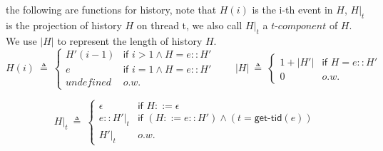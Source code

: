 \documentclass[UTF8, 8pt, a4paper ]{ctexart}
\begin{document}
\begin{small}
\begin{center}
	\vspace{0.3cm}
	
	the following are functions for history, note that $ H(i) $ is the i-th event in $ H $, $ H|_t $ is the projection of history $ H $ on thread t, we also call $ H|_t $ a $ \textit{t-component} $ of $ H $. We use $ |H| $ to represent the length of history $ H $.
	$$ H(i)\ \triangleq\ \left\{
	\begin{array}{ll}
	H'(i-1) & \textsf{if } i > 1 \land H = e::H'\\
	e & \textsf{if } i = 1 \land H = e::H'\\
	\textit{undefined} & \textit{o.w.}
	\end{array}
	\right.
	\qquad
	|H| \ \triangleq\ \left\{
	\begin{array}{ll}
		1 + |H'| & \textsf{if } H = e::H' \\
		0 & \textit{o.w.}
	\end{array}
	\right.
	 $$ 
	
	
	$$ H|_t \ \triangleq \ \left\{
	\begin{array}{ll}
		\epsilon & \textsf{if }H ::= \epsilon \\
		e :: H'|_t & \textsf{if }(H ::= e::H') \land (t = \textsf{get-tid}(e))\\
		H'|_t & \textit{o.w.}
	\end{array}
	\right.
	$$
	
	
	\begin{comment}
		
	
	
	\begin{definition}{{A response $ e' $ \textit{matches} an invocation $ e $ in $ H $, denoted $\textsf{match}(e, e') $}, if they have the same thread id:}
		
		$ \textsf{match}(e,e') \triangleq \textsf{is-inv}(e) \land \textsf{is-res}(e') \land (\textsf{get-tid}(e) = \textsf{get-tid}(e')) $
		
	\end{definition}
	
	\begin{definition}{{A History }$ H ${ is }\textit{seqential}{ iff 
		\begin{itemize}
			\item the first event is an invocation or stop
			\item every response ared followed a inv or stop: 
			\item dfg
		\end{itemize}}}
		

\end{comment}
\end{center}
\end{small}
\end{document}
